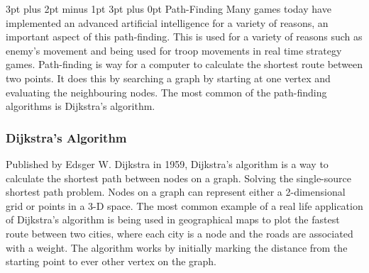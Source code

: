 \documentclass[12pt,a4paper,oneside]{book}
\makeatletter
\renewcommand\subsection{\@startsection {subsection}{1}{2mm} %
                               {3pt plus 2pt minus 1pt} %
                               {3pt plus 0pt} %
                               {\normalfont\bfseries}}
\makeatother
\begin{document}
\subsection{Path-Finding}
Many games today have implemented an advanced artificial intelligence for a variety of reasons, an important aspect of this path-finding. This is used for a variety of reasons such as enemy’s movement and being used for troop movements in real time strategy games. Path-finding is way for a computer to calculate the shortest route between two points. It does this by searching a graph by starting at one vertex and evaluating the neighbouring nodes. The most common of the path-finding algorithms is Dijkstra's algorithm.	
\subsubsection{Dijkstra’s Algorithm}
Published by Edsger W. Dijkstra in 1959, Dijkstra’s algorithm is a way to calculate the shortest path between nodes on a graph. Solving the single-source shortest path problem. Nodes on a graph can represent either a 2-dimensional grid or points in a 3-D space. The most common example of a real life application of Dijkstra’s algorithm is being used in geographical maps to plot the fastest route between two cities, where each city is a node and the roads are associated with a weight. 
\vspace{5mm} 
\newline
The algorithm works by initially marking the distance from the starting point to ever other vertex on the graph. 
\end{document}
